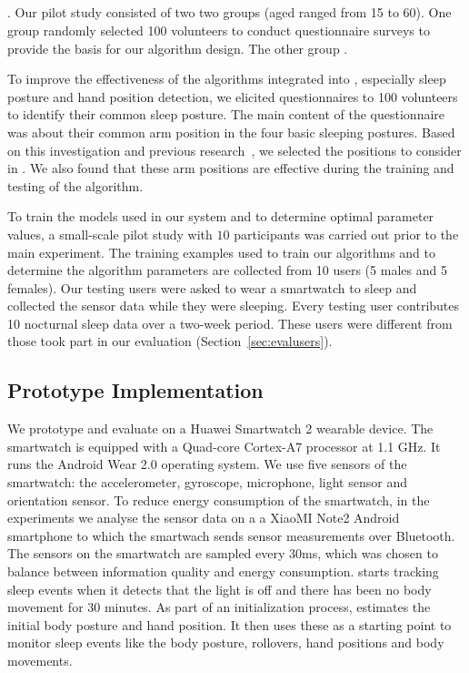\subsection{}
\label{sec:trainingdata}

. Our pilot study consisted of two two groups (aged ranged from 15 to 60). One group  randomly selected 100 volunteers to conduct questionnaire surveys to provide the basis for our algorithm design. The other group .


To improve the effectiveness of the algorithms integrated into \systemname, especially sleep posture and hand position detection, we elicited questionnaires to 100 volunteers to identify their common sleep posture. The main content of the questionnaire was about their common arm position in the four basic sleeping postures. Based on this investigation and previous research~\cite{position2014,HandPosition2}, we selected the positions to consider in \systemname. We also found that these arm positions are effective during the training and testing of the algorithm.

To train the models used in our system and to determine optimal parameter values, a small-scale pilot study with $10$ participants was carried out prior to the main experiment.  The training examples used to train our algorithms and to determine the algorithm parameters are collected from 10 users
(5 males and 5 females). Our testing users were asked to wear a smartwatch to sleep and collected the sensor data while they were sleeping. Every testing user contributes 10 nocturnal sleep data over a two-week period. These users were different from those took part in our evaluation (Section~\ref{sec:evalusers}).



\subsection{Prototype Implementation \label{sec:implementation}}
We prototype and evaluate \systemname on a Huawei Smartwatch 2 wearable device. The smartwatch is equipped with a Quad-core Cortex-A7
processor at 1.1 GHz.  It runs the Android Wear 2.0 operating system. We use five sensors of the smartwatch: the accelerometer, gyroscope,
microphone, light sensor and orientation sensor. To reduce energy consumption of the smartwatch, in the experiments we analyse the sensor data on a a XiaoMI Note2 Android smartphone to which the smartwach sends sensor measurements over Bluetooth. The sensors on the smartwatch are sampled every $30$ms, which was chosen to balance between information quality and energy consumption. \systemname starts tracking sleep events when it detects that the light is off and there has been no body movement for 30 minutes. As part of an initialization process, \systemname estimates the initial body posture and hand position. It then uses these as a starting point to monitor sleep events like the body posture, rollovers, hand positions and body movements.

